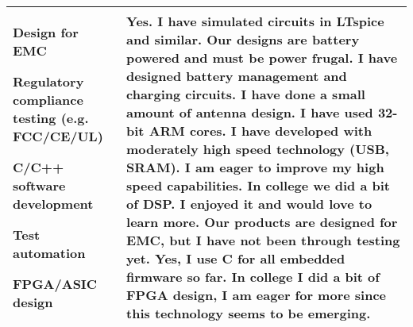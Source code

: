 \documentclass[10pt,letterpaper, table]{article}
\begin{document}
\begin{table}[h!]
{\begin{tabular}{||  m{20 em} | m{20 em} ||}
{\begin{itemize}[leftmargin=0in, rightmargin=0in, topsep=2mm,itemindent=0mm, label=\textrm{--}]
{                \item Design for EMC
                \item Regulatory compliance testing (e.g. FCC/CE/UL)
                \item C/C++ software development
                \item Test automation
                \item FPGA/ASIC design
             }
        \end{itemize}
    }
& Yes.        I have simulated circuits in LTspice and similar.
        Our designs are battery powered and must be power frugal. 
        I have designed battery management and charging circuits. 
        I have done a small amount of antenna design.
        I have used 32-bit ARM cores.
        I have developed with moderately high speed technology (USB, SRAM). I am eager to improve my high speed capabilities.
        In college we did a bit of DSP. I enjoyed it and would love to learn more.
        Our products are designed for EMC, but I have not been through testing yet. 
        Yes, I use C for all embedded firmware so far.
        In college I did a bit of FPGA design, I am eager for more since this technology seems to be emerging.
 \\ [1ex] 

 \hline
 \end{tabular}
 }
\end{table}

\vspace*{\fill}
\noindent\makebox[\linewidth]{\rule{\linewidth}{0.4pt}}
\end{document}
